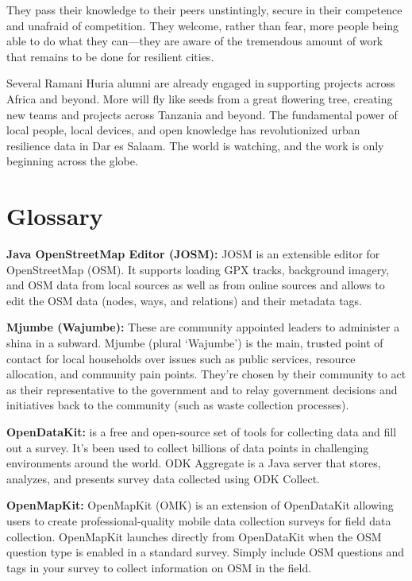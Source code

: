 \documentclass[a4paper,12pt,twoside]{article}
\begin{document}
\begin{multicols}{2}
They pass their knowledge to their peers unstintingly, secure in their competence and unafraid of competition. They welcome, rather than fear, more people being able to do what they can---they are aware of the tremendous amount of work that remains to be done for resilient cities. 

\begin{mdframed}[hidealllines=true,backgroundcolor=RHgreen!10,innerleftmargin=6pt,innerrightmargin=6pt,leftmargin=-3pt,rightmargin=-3pt]
Several Ramani Huria alumni are already engaged in supporting projects across Africa and beyond. More will fly like seeds from a great flowering tree, creating new teams and projects across Tanzania and beyond. The fundamental power of local people, local devices, and open knowledge has revolutionized urban resilience data in Dar es Salaam. The world is watching, and the work is only beginning across the globe.
\end{mdframed}

\end{multicols}

\newpage
\section{Glossary}

\textbf{Java OpenStreetMap Editor (JOSM):} JOSM is an extensible editor for ​OpenStreetMap (OSM). It supports loading GPX tracks, background imagery, and OSM data from local sources as well as from online sources and allows to edit the OSM data (nodes, ways, and relations) and their metadata tags.


\textbf{Mjumbe (Wajumbe):} These are community appointed leaders to administer a shina in a subward. Mjumbe (plural ‘Wajumbe’) is the main, trusted point of contact for local households over issues such as public services, resource allocation, and community pain points. They’re chosen by their community to act as their representative to the government and to relay government decisions and initiatives back to the community (such as waste collection processes).


\textbf {OpenDataKit:} is a free and open-source set of tools for collecting data and fill out a  survey. It's been used to collect billions of data points in challenging environments around the world. ODK Aggregate is a Java server that stores, analyzes, and presents survey data collected using ODK Collect.


\textbf{OpenMapKit:} OpenMapKit (OMK) is an extension of OpenDataKit allowing users to create professional-quality mobile data collection surveys for field data collection. OpenMapKit launches directly from OpenDataKit when the OSM question type is enabled in a standard survey. Simply include OSM questions and tags in your survey to collect information on OSM in the field.
\end{document}
